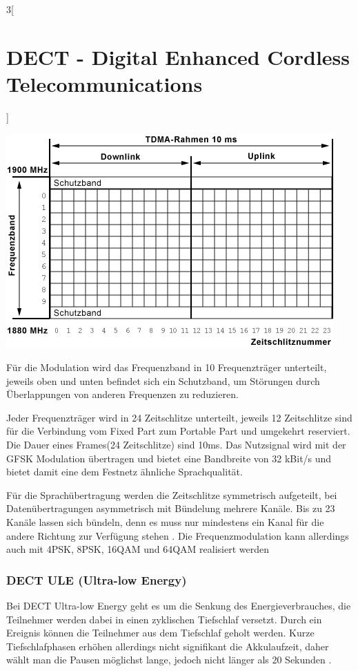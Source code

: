 \begin{multicols}{3}[\section{DECT - Digital Enhanced Cordless Telecommunications}]
\begin{Figure}
\includegraphics[width=\linewidth]{Kapitel/DECT/Grafiken/frequenzband.png}
\label{fig:dect.frequenzband}
\end{Figure}
Für die Modulation wird das Frequenzband in 10 Frequenzträger unterteilt, jeweils oben und unten befindet sich ein Schutzband, um Störungen durch Überlappungen von anderen Frequenzen zu reduzieren. 

Jeder Frequenzträger wird in 24 Zeitschlitze unterteilt, jeweils 12 Zeitschlitze sind für die Verbindung vom Fixed Part zum Portable Part und umgekehrt reserviert. Die Dauer eines Frames(24 Zeitschlitze) sind 10ms.
Das Nutzsignal wird mit der GFSK Modulation übertragen und bietet eine Bandbreite von 32 kBit/s und bietet damit eine dem Festnetz ähnliche Sprachqualität.

Für die Sprachübertragung werden die Zeitschlitze symmetrisch aufgeteilt, bei Datenübertragungen asymmetrisch mit Bündelung mehrere Kanäle. Bis zu 23 Kanäle lassen sich bündeln, denn es muss nur mindestens ein Kanal für die andere Richtung zur Verfügung stehen \cite{dect.1}.
Die Frequenzmodulation kann allerdings auch mit 4PSK, 8PSK, 16QAM und 64QAM realisiert werden

\subsubsection*{DECT ULE (Ultra-low Energy)}
Bei DECT Ultra-low Energy geht es um die Senkung des Energieverbrauches, die Teilnehmer werden dabei in einen zyklischen Tiefschlaf versetzt. Durch ein Ereignis können die Teilnehmer aus dem Tiefschlaf geholt werden. Kurze Tiefschlafphasen erhöhen allerdings nicht signifikant die Akkulaufzeit, daher wählt man die Pausen möglichst lange, jedoch nicht länger als 20 Sekunden \cite{dect.1}.


\end{multicols}
